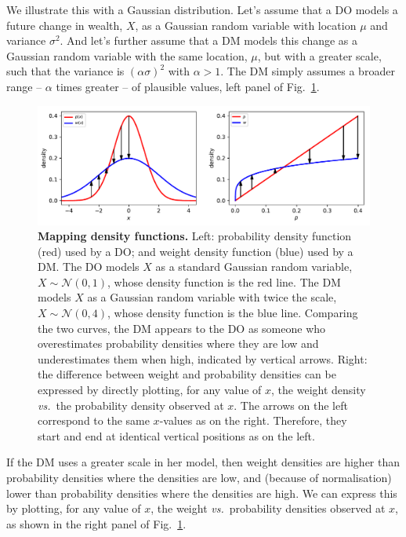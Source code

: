 \documentclass[12pt,letter,timesnewroman]{article}
\newcommand{\flabel}[1]{\label{fig:#1}}
\newcommand{\fref}[1]{Fig.~\ref{fig:#1}}
\newcommand{\vs}{\textit{vs.}\ }
\newcommand{\ND}{\mathcal{N}} %
\begin{document}
We illustrate this with a Gaussian distribution.
Let's assume that a DO models a future change in wealth, $X$, as a Gaussian random variable with location $\mu$ and variance $\sigma^2$. And let's further assume that a DM models this change as a Gaussian random variable with the same location, $\mu$, but with a greater scale, such that the variance is $(\alpha\sigma)^2$ with $\alpha>1$. The DM simply assumes a broader range -- $\alpha$ times greater -- of plausible values, left panel of \fref{mapping_pdfs}.
\begin{figure}[!htb]
\centering
\includegraphics[width=\textwidth]{../../figs/mapping_pdfs.pdf}
\caption{\textbf{Mapping density functions.}
Left: probability density function (red) used by a DO; and weight density function (blue) used by a DM. The DO models $X$ as a standard Gaussian random variable, $X \sim \ND(0,1)$, whose density function is the red line. The DM models $X$ as a Gaussian random variable with twice the scale, $X \sim \ND(0,4)$, whose density function is the blue line. Comparing the two curves, the DM appears to the DO as someone who overestimates probability densities where they are low and underestimates them when high, indicated by vertical arrows.
Right: the difference between weight and probability densities can be expressed by directly plotting, for any value of $x$, the weight density \vs the probability density observed at $x$. The arrows on the left correspond to the same $x$-values as on the right. Therefore, they start and end at identical vertical positions as on the left.
}
\flabel{mapping_pdfs}
\end{figure}

If the DM uses a greater scale in her model, then weight densities are higher than probability densities where the densities are low, and (because of normalisation) lower than probability densities where the densities are high. We can express this by plotting, for any value of $x$, the weight \vs probability densities observed at $x$, as shown in the right panel of \fref{mapping_pdfs}.
\end{document}
